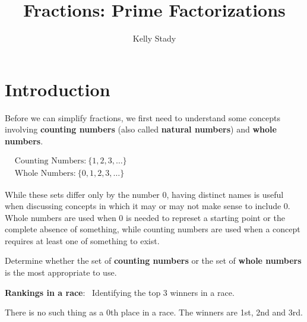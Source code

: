 \documentclass{ximera}[font=12pt]  %
\title{Fractions: Prime Factorizations}   %
\author{Kelly Stady}
\begin{document}
\begin{abstract}

\end{abstract}

\maketitle

\label{xim:FracsPrimeFact}

\section*{Introduction}

Before we can simplify fractions, we first need to understand some concepts involving \textbf{counting numbers} 
(also called \textbf{natural numbers}) and \textbf{whole numbers}.


\begin{flushleft}
\hspace{5em} %
$\begin{aligned}
& \textrm{Counting Numbers:} \ \{1, 2, 3, \dots\} \\[1.5ex]
& \textrm{Whole Numbers:} \ \{0, 1, 2, 3, \dots\}
\end{aligned}$
\end{flushleft}


While these sets differ only by the number 0, having distinct names is useful when discussing concepts in which it may or
may not make sense to include 0.  Whole numbers are used when 0 is needed to represet a starting point or the complete absence of something, 
while counting numbers are used when a concept requires at least one of something to exist.  


\begin{problem}  
Determine whether the set of \textbf{counting numbers} or the set of \textbf{whole numbers} is the most appropriate to use.

    \begin{center}
        \textbf{Rankings in a race}: \ Identifying the top 3 winners in a race.
    \end{center}

\begin{multipleChoice}
\end{multipleChoice}
\begin{feedback}
    There is no such thing as a 0th place in a race.  The winners are 1st, 2nd and 3rd.
\end{feedback}
\end{problem}
\end{document}
